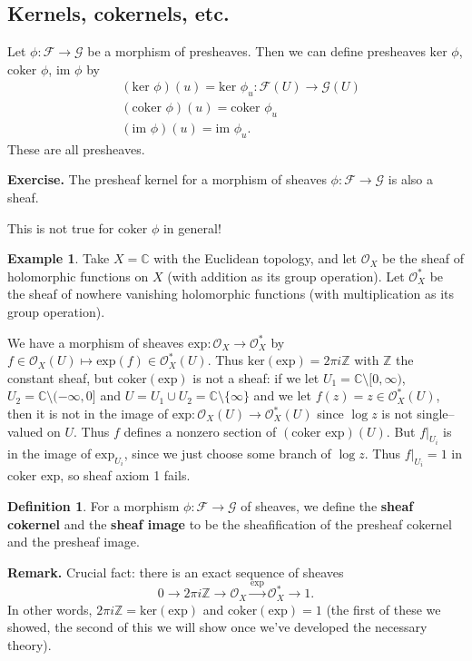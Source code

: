 \documentclass{article}
\theoremstyle{definition}
\newtheorem{example}{Example}[section]
\newtheorem{defn}{Definition}[section]
\begin{document}
\subsection{Kernels, cokernels, etc.}

Let $\phi : \mathcal{F} \to \mathcal{G}$ be a morphism of presheaves. Then we can define presheaves $\text{ker } \phi$, $\text{coker } \phi$, $\text{im } \phi$ by \begin{align*}
    &(\text{ker }\phi)(u) = \text{ker }\phi_u : \mathcal{F}(U) \to \mathcal{G}(U)\\
    &(\text{coker }\phi)(u) = \text{coker }\phi_u\\
    &(\text{im }\phi)(u) = \text{im }\phi_u.
\end{align*}
These are all presheaves.

\textbf{Exercise.} The presheaf kernel for a morphism of sheaves $\phi: \mathcal{F} \to \mathcal{G}$ is also a sheaf.
\vspace{1mm}
 
This is not true for $\text{coker }\phi$ in general!
\begin{example}
    Take $X = \mathbb{C}$ with the Euclidean topology, and let $\mathcal{O}_X$ be the sheaf of holomorphic functions on $X$ (with addition as its group operation). Let $\mathcal{O}_X^*$ be the sheaf of nowhere vanishing holomorphic functions (with multiplication as its group operation). 
    \vspace{1mm}
     
    We have a morphism of sheaves $\text{exp}: \mathcal{O}_X \to \mathcal{O}_X^*$ by $f \in \mathcal{O}_X(U) \mapsto \text{exp}(f) \in\mathcal{O}_X^*(U)$. Thus $\text{ker}(\text{exp}) = 2 \pi i \mathbb{Z}$ with $\mathbb{Z}$ the constant sheaf, but $\text{coker}(\text{exp})$ is not a sheaf: if we let $U_1 = \mathbb{C}\setminus [0,\infty)$, $U_2 = \mathbb{C}\setminus (-\infty,0]$ and $U = U_1 \cup U_2 = \mathbb{C}\setminus \{\infty\}$ and we let $f(z)=z \in \mathcal{O}_X^*(U)$, then it is not in the image of $\text{exp}:\mathcal{O}_X(U) \to \mathcal{O}_X^*(U)$ since $\log z$ is not single--valued on $U$. Thus $f$ defines a nonzero section of $(\text{coker exp})(U)$. But $f|_{U_i}$ is in the image of $\text{exp}_{U_i}$, since we just choose some branch of $\log z$. Thus $f|_{U_i} = 1$ in $\text{coker exp}$, so sheaf axiom 1 fails.
\end{example}
\begin{defn}
    For a morphism $\phi : \mathcal{F} \to \mathcal{G}$ of sheaves, we define the \textbf{sheaf cokernel} and the \textbf{sheaf image} to be the sheafification of the presheaf cokernel and the presheaf image.
\end{defn}
\textbf{Remark.} Crucial fact: there is an exact sequence of sheaves \[
0 \to 2\pi i \mathbb{Z} \to \mathcal{O}_X \stackrel{\text{exp}}{\to} \mathcal{O}_X^* \to 1.
\]
In other words, $2\pi i \mathbb{Z} = \text{ker}(\text{exp})$ and $\text{coker}(\text{exp}) = 1$ (the first of these we showed, the second of this we will show once we've developed the necessary theory). 
\vspace{1mm}
 
\end{document}
